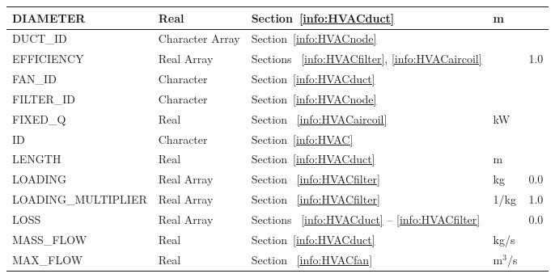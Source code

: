\documentclass[11pt]{book}
\begin{document}
\begin{longtable}{@{\extracolsep{\fill}}|l|l|l|l|l|}
{\ct DIAMETER}                  & Real              & Section~\ref{info:HVACduct}                                                   &  m            &                \\ \hline
{\ct DUCT\_ID}                  & Character Array   & Section~\ref{info:HVACnode}                                                   &               &                \\ \hline
{\ct EFFICIENCY}                & Real Array        & Sections ~\ref{info:HVACfilter}, \ref{info:HVACaircoil}                       &               & 1.0            \\ \hline
{\ct FAN\_ID}                   & Character         & Section~\ref{info:HVACduct}                                                   &               &                \\ \hline
{\ct FILTER\_ID}                & Character         & Section~\ref{info:HVACnode}                                                   &               &                \\ \hline
{\ct FIXED\_Q}                  & Real              & Section ~\ref{info:HVACaircoil}                                               & kW            &                \\ \hline
{\ct ID}                        & Character         & Section~\ref{info:HVAC}                                                       &               &                \\ \hline
{\ct LENGTH}                    & Real              & Section~\ref{info:HVACduct}                                                   &  m            &                \\ \hline
{\ct LOADING}                   & Real Array        &  Section ~\ref{info:HVACfilter}                                               & kg            & 0.0            \\ \hline
{\ct LOADING\_MULTIPLIER}       & Real Array        &  Section ~\ref{info:HVACfilter}                                               & 1/kg          & 1.0            \\ \hline
{\ct LOSS}                      & Real Array        & Sections ~\ref{info:HVACduct} -- \ref{info:HVACfilter}                        &               & 0.0            \\ \hline
{\ct MASS\_FLOW  }              & Real              & Section~\ref{info:HVACduct}                                                  &  kg/s      &                \\ \hline
{\ct MAX\_FLOW}                 & Real              & Section ~\ref{info:HVACfan}                                                   &  m$^3$/s      &                \\ \hline

\end{longtable}
\end{document}
